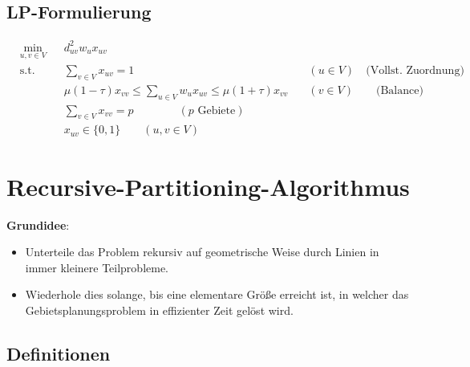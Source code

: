 
    \subsection{LP-Formulierung} %
    \label{sub:lp_formulierung}

      \begin{equation*}
        \begin{aligned}
          & \underset{u,v \in V}{\text{min}}
          & & d_{uv}^2w_{u}x_{uv}\\
          & \text{s.t.}
          & & \sum_{v \in V}x_{uv} = 1 & \quad (u \in V) \quad \text{(Vollst. Zuordnung)}\\ 
          & & & \mu(1 - \tau)x_{vv} \leq \sum_{u \in V}w_ux_{uv} \leq \mu(1 + \tau)x_{vv} &\quad  (v \in V)\quad \quad \text{(Balance)} \\
          & & &\sum_{v \in V}x_{vv} = p \qquad \qquad(p \text{ Gebiete})\\
          & & &x_{uv} \in \{0, 1\}  \qquad (u, v \in V)
        \end{aligned}
        \label{LEN principal problem}
      \end{equation*}
    
  

  \section{Recursive-Partitioning-Algorithmus} %
  \label{sec:recursive_partitioning_algorithmus}

    \par {\color{blue}{(Bsp: Aufgabe 19)}}

    \par \textbf{Grundidee}:
      \begin{itemize}
         \item Unterteile das Problem rekursiv auf geometrische Weise durch Linien in immer kleinere Teilprobleme.
         \item Wiederhole dies solange, bis eine elementare Größe erreicht ist, in welcher das Gebietsplanungsproblem in effizienter Zeit gelöst wird.
       \end{itemize} 

    \subsection{Definitionen} %
    \label{sub:definitionen}

